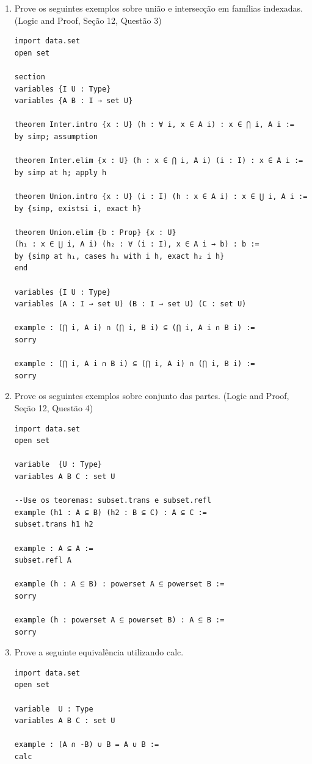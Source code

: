 \begin{enumerate}
\item Prove os seguintes exemplos sobre união e intersecção em famílias indexadas. (Logic and Proof, Seção 12, Questão 3)
\begin{lstlisting}
import data.set
open set
  
section
variables {I U : Type}
variables {A B : I → set U}
  
theorem Inter.intro {x : U} (h : ∀ i, x ∈ A i) : x ∈ ⋂ i, A i :=
by simp; assumption
  
theorem Inter.elim {x : U} (h : x ∈ ⋂ i, A i) (i : I) : x ∈ A i :=
by simp at h; apply h
  
theorem Union.intro {x : U} (i : I) (h : x ∈ A i) : x ∈ ⋃ i, A i :=
by {simp, existsi i, exact h}
  
theorem Union.elim {b : Prop} {x : U}
(h₁ : x ∈ ⋃ i, A i) (h₂ : ∀ (i : I), x ∈ A i → b) : b :=
by {simp at h₁, cases h₁ with i h, exact h₂ i h}
end
  
variables {I U : Type}
variables (A : I → set U) (B : I → set U) (C : set U)
  
example : (⋂ i, A i) ∩ (⋂ i, B i) ⊆ (⋂ i, A i ∩ B i) :=
sorry

example : (⋂ i, A i ∩ B i) ⊆ (⋂ i, A i) ∩ (⋂ i, B i) :=
sorry\end{lstlisting}

\item Prove os seguintes exemplos sobre conjunto das partes. (Logic and Proof, Seção 12, Questão 4)
\begin{lstlisting}
import data.set
open set

variable  {U : Type}
variables A B C : set U

--Use os teoremas: subset.trans e subset.refl
example (h1 : A ⊆ B) (h2 : B ⊆ C) : A ⊆ C :=
subset.trans h1 h2

example : A ⊆ A :=
subset.refl A

example (h : A ⊆ B) : powerset A ⊆ powerset B :=
sorry

example (h : powerset A ⊆ powerset B) : A ⊆ B :=
sorry\end{lstlisting}

\item Prove a seguinte equivalência utilizando calc.
\begin{lstlisting}
import data.set
open set
  
variable  U : Type
variables A B C : set U
  
example : (A ∩ -B) ∪ B = A ∪ B :=
calc
\end{lstlisting}

\end{enumerate}

